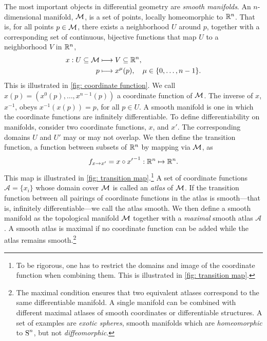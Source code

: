 The most important objects in differential geometry are \emph{smooth manifolds}.
An $n$-dimensional manifold, $\mathcal{M}$, is a set of points, locally homeomorphic to $\mathbb{R}^n$.
That is, for all points $p \in \mathcal{M}$, there exists a neighborhood $U$ around $p$, together with a corresponding set of continuous, bijective functions that map $U$ to a neighborhood $V$ in $\mathbb{R}^n$,
%
\begin{align}
    x: U \subseteq \mathcal{M} & \longmapsto V \subseteq \mathbb{R}^n, \\
    p & \longmapsto x^\mu(p), \quad \mu \in \{0, \dots, n-1\}.
\end{align}
%
This is illustrated in \autoref{fig: coordinate function}.
We call $x(p) = (x^0(p), \dots, x^{n- 1}(p))$ a coordinate function of $\mathcal{M}$.
The inverse of $x$, $x^{-1}$, obeys $x^{-1}(x(p)) = p$, for all $p \in U$.
A smooth manifold is one in which the coordinate functions are infinitely differentiable.
To define differentiability on manifolds, consider two coordinate functions, $x$, and $x'$.
The corresponding domains $U$ and $U'$ may or may not overlap.
We then define the transition function, a function between subsets of $\mathbb{R}^n$ by mapping via $\mathcal{M}$, as
%
\begin{align}
    f_{x\rightarrow x'} = x \circ {x'}^{-1} : \mathbb{R}^n \mapsto \mathbb{R}^n.
\end{align}
%
This map is illustrated in \autoref{fig: transition map}.\footnote{
    To be rigorous, one has to restrict the domains and image of the coordinate function when combining them. This is illustrated in \autoref{fig: transition map}.
    }
A set of coordinate functions $\mathcal A = \{x_i\}$ whose domain cover $\mathcal{M}$ is called an \emph{atlas} of $\mathcal{M}$.
If the transition function between all pairings of coordinate functions in the atlas is smooth---that is, infinitely differentiable---we call the atlas smooth.
We then define a smooth manifold as the topological manifold $\mathcal{M}$ together with a \emph{maximal} smooth atlas $\mathcal A$.
A smooth atlas is maximal if no coordinate function can be added while the atlas remains smooth.\footnote{
    The maximal condition ensures that two equivalent atlases correspond to the same differentiable manifold. A single manifold can be combined with different maximal atlases of smooth coordinates or differentiable structures. A set of examples are \emph{exotic spheres}, smooth manifolds which are \emph{homeomorphic} to $\text S^n$, but not \emph{diffeomorphic}. 
    }
%
